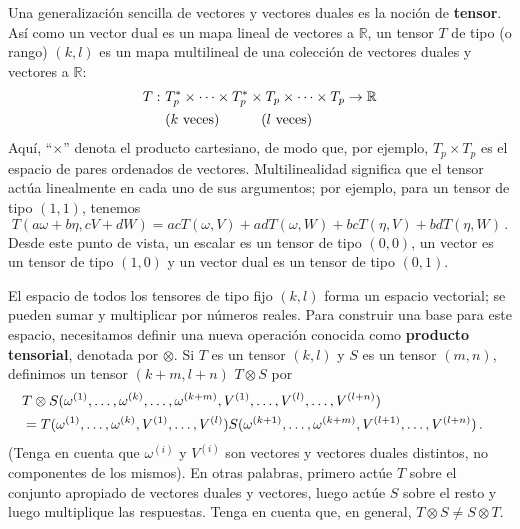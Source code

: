 \documentclass[11pt,b5paper,openany,twoside]{book}
\begin{document}
Una generalización sencilla de vectores y vectores duales es la noción de {\bf tensor}.
Así como un vector dual es un mapa lineal de vectores a $\mathbb{R}$, un tensor $T$ de tipo (o rango) $(k,l)$ es un mapa multilineal de una colección de vectores duales y vectores a $\mathbb{R}$:
\begin{align}
T:~ &T^*_p\times\cdots\times T^*_p\times T_p\times\cdots
\times T_p \rightarrow \mathbb{R}\nonumber \\
& (k~{\rm veces})\qquad\quad (l~{\rm veces}) \label{1.44}
\end{align}
Aquí, ``$\times$'' denota el producto cartesiano, de modo que, por ejemplo, $T_p\times T_p$ es el espacio de pares ordenados de vectores.
Multilinealidad significa que el tensor actúa linealmente en cada uno de sus argumentos; por ejemplo, para un tensor de tipo $(1,1)$, tenemos
\begin{equation}
T(a\omega+b\eta, cV+dW) = acT(\omega,V)+adT(\omega,W)+bcT(\eta,V)
+bdT(\eta,W)\,.\label{1.45}
\end{equation}
Desde este punto de vista, un escalar es un tensor de tipo $(0,0)$, un vector es un tensor de tipo $(1,0)$ y un vector dual es un tensor de tipo $(0,1)$.

El espacio de todos los tensores de tipo fijo $(k,l)$ forma un espacio vectorial; se pueden sumar y multiplicar por números reales.
Para construir una base para este espacio, necesitamos definir una nueva operación conocida como {\bf producto tensorial}, denotada por $\otimes$.
Si $T$ es un tensor $(k,l)$ y $S$ es un tensor $(m,n)$, definimos un tensor $(k+m,l+n)$ $T\otimes S$ por
\begin{align}
\lefteqn{T\otimes S(\omega^{(1)},\ldots ,\omega^{(k)},\ldots
,\omega^{(k+m)},V^{(1)},\ldots ,V^{(l)},\ldots ,V^{(l+n)})} \nonumber \\
& =
T(\omega^{(1)},\ldots ,\omega^{(k)},V^{(1)},\ldots ,V^{(l)})
S(\omega^{(k+1)},\ldots ,\omega^{(k+m)},V^{(l+1)},\ldots ,V^{(l+n)})
\,.\label{1.46}
\end{align}
(Tenga en cuenta que $\omega^{(i)}$ y $V^{(i)}$ son vectores y vectores duales distintos, no componentes de los mismos).
En otras palabras, primero actúe $T$ sobre el conjunto apropiado de vectores duales y vectores, luego actúe $S$ sobre el resto y luego multiplique las respuestas.
Tenga en cuenta que, en general, $T\otimes S \neq S\otimes T$.
\end{document}
